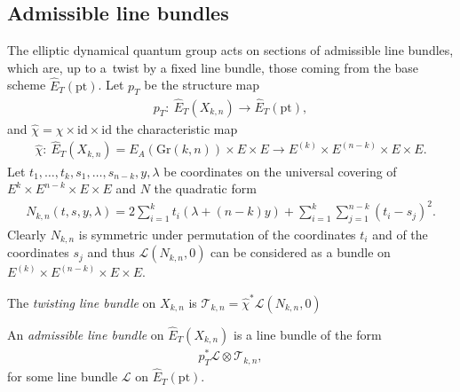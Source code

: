 \documentclass[pdftex]{sigma}
\numberwithin{equation}{section}
\begin{document}
\subsection{Admissible line bundles}
The elliptic dynamical quantum group acts on sections of admissible line bundles, which are, up to a~twist by a fixed line bundle, those coming from the base scheme $\hat E_{T}(\mathrm{pt})$. Let $p_T$ be the structure map
\begin{gather*}
 p_T\colon \ \hat E_T(X_{k,n})\to \hat E_T(\mathrm{pt}),
\end{gather*}
and $\hat\chi=\chi\times \mathrm{id}\times\mathrm{id}$ the characteristic map
\begin{gather*}
 \hat\chi \colon \ \hat E_T(X_{k,n})=E_A(\mathrm{Gr}(k,n))\times E\times E\to E^{(k)}\times E^{(n-k)}\times E\times E.
\end{gather*}
Let $t_1,\dots,t_k,s_1,\dots,s_{n-k},y,\lambda$ be coordinates on the universal covering of $E^k\times E^{n-k}\times E\times E$ and $N$ the quadratic form
\begin{gather}\label{e-Nkn}
 N_{k,n}(t,s,y,\lambda)=2\sum_{i=1}^k t_i(\lambda+(n-k)y)+\sum_{i=1}^k\sum_{j=1}^{n-k}(t_i-s_j)^2.
\end{gather}
Clearly $N_{k,n}$ is symmetric under permutation of the coordinates $t_i$ and of the coordinates $s_j$ and thus $\mathcal L(N_{k,n},0)$ can be considered as a bundle on $E^{(k)}\times E^{(n-k)}\times E\times E$.
\begin{Definition}\label{def-tlb}
 The {\em twisting line bundle} on $X_{k,n}$ is $\mathcal T_{k,n}=\hat\chi^*\mathcal L(N_{k,n},0)$
\end{Definition}
\begin{Definition} An {\em admissible line bundle} on $\hat E_T(X_{k,n})$ is a line bundle of the form
 \begin{gather*}
 p_T^*\mathcal L\otimes \mathcal T_{k,n},
 \end{gather*}
 for some line bundle $\mathcal L$ on $\hat E_T(\mathrm{pt})$.
\end{Definition}
\end{document}
